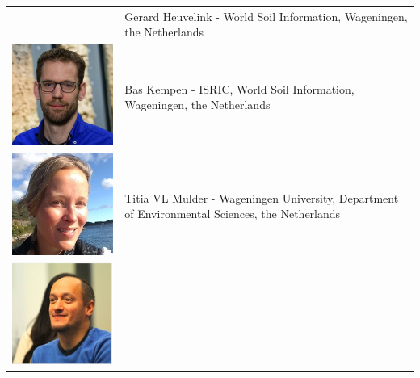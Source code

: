 \documentclass[10pt,b5paper,]{book}
\theoremstyle{definition}
\theoremstyle{definition}
\theoremstyle{definition}
\theoremstyle{remark}
\begin{document}
\begin{longtable}[]{@{}ll@{}}
\begin{minipage}[t]{0.13\columnwidth}
\end{minipage} & \begin{minipage}[t]{0.81\columnwidth}\raggedright
Gerard Heuvelink - World Soil Information, Wageningen, the
Netherlands\strut
\end{minipage}\tabularnewline
\begin{minipage}[t]{0.13\columnwidth}\raggedright
\includegraphics{contrAuthors/Kempen.jpg}\strut
\end{minipage} & \begin{minipage}[t]{0.81\columnwidth}\raggedright
Bas Kempen - ISRIC, World Soil Information, Wageningen, the
Netherlands\strut
\end{minipage}\tabularnewline
\begin{minipage}[t]{0.13\columnwidth}\raggedright
\includegraphics{contrAuthors/Mulder.jpeg}\strut
\end{minipage} & \begin{minipage}[t]{0.81\columnwidth}\raggedright
Titia VL Mulder - Wageningen University, Department of Environmental
Sciences, the Netherlands\strut
\end{minipage}\tabularnewline
\begin{minipage}[t]{0.13\columnwidth}\raggedright
\includegraphics{contrAuthors/Olmedo.png}\strut

\end{minipage}
\end{longtable}
\end{document}
